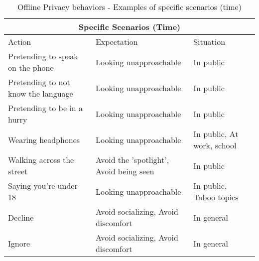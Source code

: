 \begin{table}[H]
    \centering
\begin{tabular}{ |p{5cm}||p{6cm}|p{4cm}|  }
\hline
\multicolumn{3}{|c|}{Specific Scenarios (Time)} \\
\hline
\hline
    Action & Expectation & Situation\\
\hline
\hline
    Pretending to speak on the phone & Looking unapproachable & In public \\
\hline    
    Pretending to not know the language & Looking unapproachable & In public \\
\hline      
    Pretending to be in a hurry & Looking unapproachable & In public \\
\hline      
    Wearing headphones & Looking unapproachable & In public, At work, school \\
\hline      
    Walking across the street & Avoid the 'spotlight', Avoid being seen & In public \\
\hline      
    Saying you're under 18 & Looking unapproachable & In public, Taboo topics \\
\hline      
    Decline & Avoid socializing, Avoid discomfort & In general \\
\hline      
    Ignore & Avoid socializing, Avoid discomfort & In general \\
\hline  
\end{tabular}
\caption{Offline Privacy behaviors - Examples of specific scenarios (time)}
    \label{tab:meng_t1}
\end{table}

